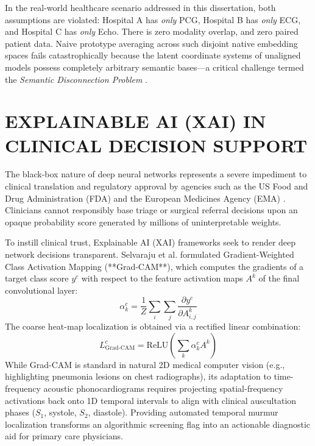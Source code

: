 \documentclass[12pt,a4paper]{amritareport}
\begin{document}
In the real-world healthcare scenario addressed in this dissertation, both assumptions are violated: Hospital A has \textit{only} PCG, Hospital B has \textit{only} ECG, and Hospital C has \textit{only} Echo. There is zero modality overlap, and zero paired patient data. Naive prototype averaging across such disjoint native embedding spaces fails catastrophically because the latent coordinate systems of unaligned models possess completely arbitrary semantic bases—a critical challenge termed the \textit{Semantic Disconnection Problem} \cite{le2024multimodal}.


\section{EXPLAINABLE AI (XAI) IN CLINICAL DECISION SUPPORT}

The black-box nature of deep neural networks represents a severe impediment to clinical translation and regulatory approval by agencies such as the US Food and Drug Administration (FDA) and the European Medicines Agency (EMA) \cite{amann2020explainability}. Clinicians cannot responsibly base triage or surgical referral decisions upon an opaque probability score generated by millions of uninterpretable weights. 

To instill clinical trust, Explainable AI (XAI) frameworks seek to render deep network decisions transparent. Selvaraju et al. \cite{selvaraju2017grad} formulated Gradient-Weighted Class Activation Mapping (**Grad-CAM**), which computes the gradients of a target class score $y^c$ with respect to the feature activation maps $A^k$ of the final convolutional layer:
\begin{equation}
	\alpha_k^c = \frac{1}{Z} \sum_{i} \sum_{j} \frac{\partial y^c}{\partial A_{i, j}^k}
\end{equation}
The coarse heat-map localization is obtained via a rectified linear combination:
\begin{equation}
	L_{\text{Grad-CAM}}^c = \text{ReLU}\left(\sum_k \alpha_k^c A^k\right)
\end{equation}
While Grad-CAM is standard in natural 2D medical computer vision (e.g., highlighting pneumonia lesions on chest radiographs), its adaptation to time-frequency acoustic phonocardiograms requires projecting spatial-frequency activations back onto 1D temporal intervals to align with clinical auscultation phases ($S_1$, systole, $S_2$, diastole). Providing automated temporal murmur localization transforms an algorithmic screening flag into an actionable diagnostic aid for primary care physicians.
\end{document}
